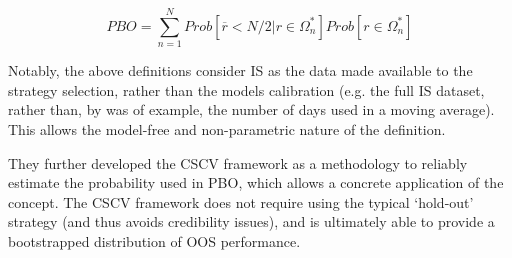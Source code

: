 \documentclass[a4paper,latin]{paper}
\begin{document}
\begin{equation}\label{eq:PBO2}
PBO = \sum_{n=1}^{N}Prob[\overline{r} < {N/2}|r\in\Omega_{n}^{*}]Prob[r\in\Omega_{n}^{*}]
\end{equation}

Notably, the above definitions consider IS as the data made available to the strategy selection, rather than the 
models calibration (e.g. the full IS dataset, rather than, by was of example, the number of days used in a moving average). 
This allows the model-free and non-parametric nature of the definition. 
\hfill \break 

They further developed the CSCV framework as a methodology to reliably estimate the probability used in PBO, which allows a concrete application of the concept. The CSCV framework does not require using the typical ‘hold-out’ strategy (and thus avoids credibility issues), and is ultimately able to provide a bootstrapped distribution of OOS performance. 
\hfill \break 
\end{document}
